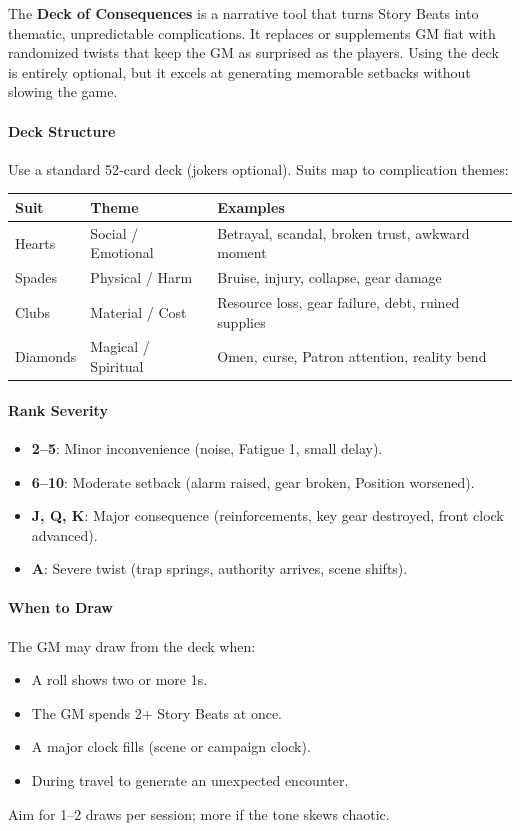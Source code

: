 The \textbf{Deck of Consequences} is a narrative tool that turns Story Beats into thematic, unpredictable complications. It replaces or supplements GM fiat with randomized twists that keep the GM as surprised as the players. Using the deck is entirely optional, but it excels at generating memorable setbacks without slowing the game.

\paragraph{Deck Structure}
Use a standard 52‑card deck (jokers optional). Suits map to complication themes:

\begin{center}
\begin{tabular}{lll}
\toprule
\textbf{Suit} & \textbf{Theme} & \textbf{Examples} \\
\midrule
Hearts   & Social / Emotional & Betrayal, scandal, broken trust, awkward moment \\
Spades   & Physical / Harm & Bruise, injury, collapse, gear damage \\
Clubs    & Material / Cost & Resource loss, gear failure, debt, ruined supplies \\
Diamonds & Magical / Spiritual & Omen, curse, Patron attention, reality bend \\
\bottomrule
\end{tabular}
\end{center}

\paragraph{Rank Severity}
\begin{itemize}
  \item \textbf{2--5}: Minor inconvenience (noise, Fatigue 1, small delay).
  \item \textbf{6--10}: Moderate setback (alarm raised, gear broken, Position worsened).
  \item \textbf{J, Q, K}: Major consequence (reinforcements, key gear destroyed, front clock advanced).
  \item \textbf{A}: Severe twist (trap springs, authority arrives, scene shifts).
\end{itemize}

\paragraph{When to Draw}
The GM may draw from the deck when:
\begin{itemize}
  \item A roll shows two or more 1s.
  \item The GM spends 2+ Story Beats at once.
  \item A major clock fills (scene or campaign clock).
  \item During travel to generate an unexpected encounter.
\end{itemize}
Aim for 1–2 draws per session; more if the tone skews chaotic.


